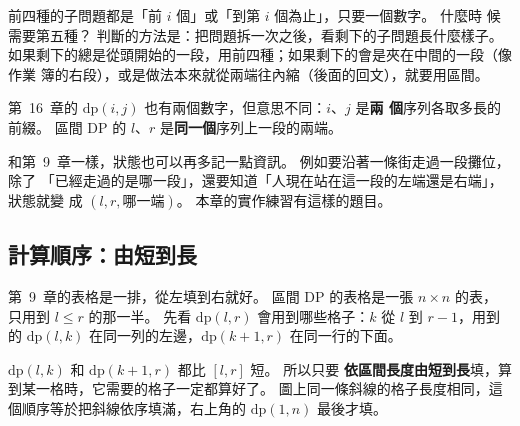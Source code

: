 前四種的子問題都是「前 $i$ 個」或「到第 $i$ 個為止」，只要一個數字。 什麼時
候需要第五種？ 判斷的方法是：把問題拆一次之後，看剩下的子問題長什麼樣子。
如果剩下的總是從頭開始的一段，用前四種；如果剩下的會是夾在中間的一段（像作業
簿的右段），或是做法本來就從兩端往內縮（後面的回文），就要用區間。

第~16~章的 $\mathrm{dp}(i, j)$ 也有兩個數字，但意思不同：$i$、$j$ 是\textbf{兩
個}序列各取多長的前綴。 區間 DP 的 $l$、$r$ 是\textbf{同一個}序列上一段的兩端。

和第~9~章一樣，狀態也可以再多記一點資訊。 例如要沿著一條街走過一段攤位，除了
「已經走過的是哪一段」，還要知道「人現在站在這一段的左端還是右端」，狀態就變
成 $(l, r, \text{哪一端})$。 本章的實作練習有這樣的題目。

\subsection{計算順序：由短到長}
\label{sec:ivdp-order}

第~9~章的表格是一排，從左填到右就好。 區間 DP 的表格是一張 $n \times n$ 的表，
只用到 $l \le r$ 的那一半。 先看 $\mathrm{dp}(l, r)$ 會用到哪些格子：$k$ 從
$l$ 到 $r - 1$，用到的 $\mathrm{dp}(l, k)$ 在同一列的左邊，$\mathrm{dp}(k + 1, r)$
在同一行的下面。

\begin{center}
\label{fig:ivdp-table}
\end{center}

$\mathrm{dp}(l, k)$ 和 $\mathrm{dp}(k + 1, r)$ 都比 $[l, r]$ 短。 所以只要
\textbf{依區間長度由短到長}填，算到某一格時，它需要的格子一定都算好了。
圖上同一條斜線的格子長度相同，這個順序等於把斜線依序填滿，右上角的
$\mathrm{dp}(1, n)$ 最後才填。

